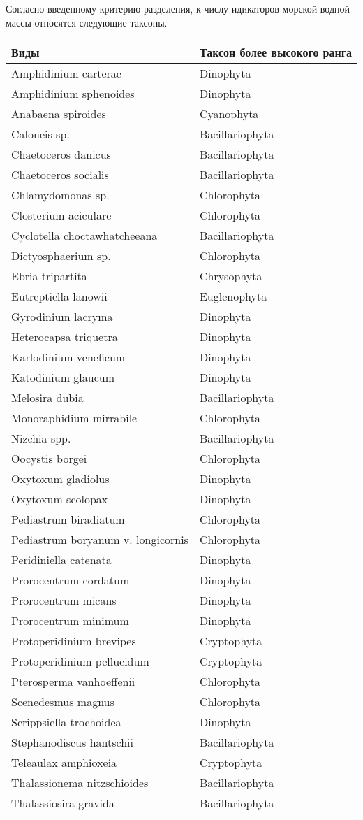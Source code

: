 \documentclass[
]{article}
\begin{document}
Согласно введенному критерию разделения, к числу идикаторов морской
водной массы относятся следующие таксоны.

\begin{longtable}[]{@{}ll@{}}
\toprule
Виды & Таксон более высокого ранга \\
\midrule
\endhead
Amphidinium carterae & Dinophyta \\
Amphidinium sphenoides & Dinophyta \\
Anabaena spiroides & Cyanophyta \\
Caloneis sp. & Bacillariophyta \\
Chaetoceros danicus & Bacillariophyta \\
Chaetoceros socialis & Bacillariophyta \\
Chlamydomonas sp. & Chlorophyta \\
Closterium aciculare & Chlorophyta \\
Cyclotella choctawhatcheeana & Bacillariophyta \\
Dictyosphaerium sp. & Chlorophyta \\
Ebria tripartita & Chrysophyta \\
Eutreptiella lanowii & Euglenophyta \\
Gyrodinium lacryma & Dinophyta \\
Heterocapsa triquetra & Dinophyta \\
Karlodinium veneficum & Dinophyta \\
Katodinium glaucum & Dinophyta \\
Melosira dubia & Bacillariophyta \\
Monoraphidium mirrabile & Chlorophyta \\
Nizchia spp. & Bacillariophyta \\
Oocystis borgei & Chlorophyta \\
Oxytoxum gladiolus & Dinophyta \\
Oxytoxum scolopax & Dinophyta \\
Pediastrum biradiatum & Chlorophyta \\
Pediastrum boryanum v. longicornis & Chlorophyta \\
Peridiniella catenata & Dinophyta \\
Prorocentrum cordatum & Dinophyta \\
Prorocentrum micans & Dinophyta \\
Prorocentrum minimum & Dinophyta \\
Protoperidinium brevipes & Cryptophyta \\
Protoperidinium pellucidum & Cryptophyta \\
Pterosperma vanhoeffenii & Chlorophyta \\
Scenedesmus magnus & Chlorophyta \\
Scrippsiella trochoidea & Dinophyta \\
Stephanodiscus hantschii & Bacillariophyta \\
Teleaulax amphioxeia & Cryptophyta \\
Thalassionema nitzschioides & Bacillariophyta \\
Thalassiosira gravida & Bacillariophyta \\
\bottomrule
\end{longtable}
\end{document}
